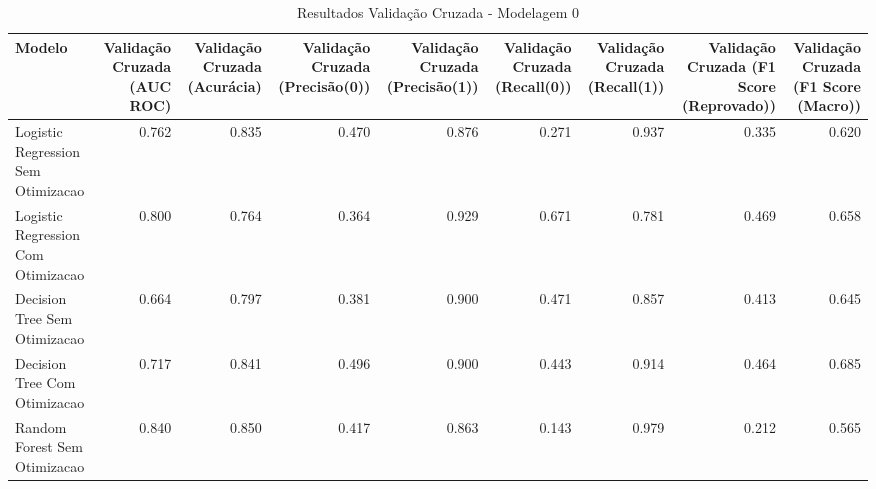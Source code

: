 \begin{table}[H] %
    \centering
    \caption{Resultados Validação Cruzada - Modelagem 0}
    \label{tab:resultados_cv_modelagem_0}
    \renewcommand{\arraystretch}{1.25} %
    \begin{adjustwidth}{ -1in }{ -1in } %
    \centering %
    \small %
    \begin{tabular}{lrrrrrrrr}
\toprule
                            Modelo &  Validação Cruzada (AUC ROC) &  Validação Cruzada (Acurácia) &  Validação Cruzada (Precisão(0)) &  Validação Cruzada (Precisão(1)) &  Validação Cruzada (Recall(0)) &  Validação Cruzada (Recall(1)) &  Validação Cruzada (F1 Score (Reprovado)) &  Validação Cruzada (F1 Score (Macro)) \\
\midrule
Logistic Regression Sem Otimizacao &                        0.762 &                         0.835 &                            0.470 &                            0.876 &                          0.271 &                          0.937 &                                     0.335 &                                 0.620 \\
Logistic Regression Com Otimizacao &                        0.800 &                         0.764 &                            0.364 &                            0.929 &                          0.671 &                          0.781 &                                     0.469 &                                 0.658 \\
      Decision Tree Sem Otimizacao &                        0.664 &                         0.797 &                            0.381 &                            0.900 &                          0.471 &                          0.857 &                                     0.413 &                                 0.645 \\
      Decision Tree Com Otimizacao &                        0.717 &                         0.841 &                            0.496 &                            0.900 &                          0.443 &                          0.914 &                                     0.464 &                                 0.685 \\
      Random Forest Sem Otimizacao &                        0.840 &                         0.850 &                            0.417 &                            0.863 &                          0.143 &                          0.979 &                                     0.212 &                                 0.565 \\

\end{tabular}
\end{adjustwidth}
\end{table}
